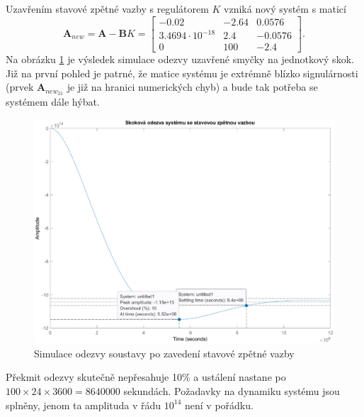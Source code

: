 \documentclass[twoside]{article}
\begin{document}
Uzavřením stavové zpětné vazby s regulátorem $K$ vzniká nový systém s maticí 
\begin{equation}
	\mathbf{A}_{new} = \mathbf{A} - \mathbf{B}K = \begin{bmatrix}
		-0.02 &   -2.64 &    0.0576 \\
		3.4694 \cdot 10^{-18}  &   2.4  &  -0.0576   \\
			 0  & 100  &  -2.4
	\end{bmatrix}.
\end{equation}
Na obrázku \ref{fig:wrong_gain} je výsledek simulace odezvy uzavřené smyčky na jednotkový skok. Již na první pohled je patrné,
že matice systému je extrémně blízko signulárnosti (prvek $\mathbf{A}_{new_{21}}$ je již na hranici numerických chyb)
a bude tak potřeba se systémem dále hýbat.

\begin{figure}[htbp]
	\centering
	\includegraphics[width=\linewidth]{skokova_odezva.eps}
	\caption{Simulace odezvy soustavy po zavedení stavové zpětné vazby}
	\label{fig:wrong_gain}
\end{figure}
Překmit odezvy skutečně nepřesahuje 10\% a ustálení nastane po $100 \times 24 \times 3600 = 8640000$ sekundách.
Požadavky na dynamiku systému jsou splněny, jenom ta amplituda v řádu $10^{14}$ není v pořádku.
\end{document}
